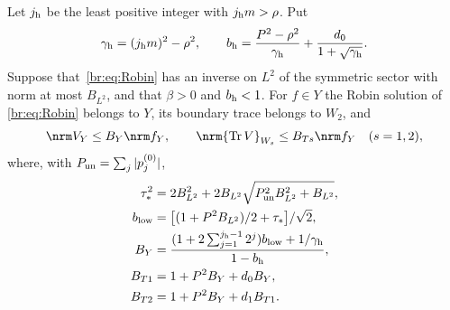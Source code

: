 \begin{proposition}\label{br:prop:transfer}
Let $j_{\rm h}$ be the least positive integer with $j_{\rm h}m>\rho$. Put
\begin{equation}\label{br:eq:high-data}
 \gamma_{\rm h}=(j_{\rm h}m)^2-\rho^2,\qquad
 b_{\rm h}=\frac{P^2-\rho^2}{\gamma_{\rm h}}+\frac{d_0}{1+\sqrt{\gamma_{\rm h}}}.
\end{equation}
Suppose that~\eqref{br:eq:Robin} has an inverse on $L^2$ of the
symmetric sector with norm at most $B_{L^2}$, and that $\beta>0$
and $b_{\rm h}<1$. For $f\in Y$ the Robin solution of
\eqref{br:eq:Robin} belongs to $Y$, its boundary trace belongs to $W_2$,
and
\begin{equation}\label{br:eq:transfer-bounds}
 \nrm V_Y\le B_Y\nrm f_Y,\qquad
 \nrm{\operatorname{Tr}V}_{W_s}\le B_{Ts}\nrm f_Y\quad(s=1,2),
\end{equation}
where, with $P_{\rm un}=\sum_j|p_j^{(0)}|$,
\begin{equation}\label{br:eq:transfer-constants}
 \begin{split}
 \tau_*^2&=2B_{L^2}^2+
 2B_{L^2}\sqrt{P_{\rm un}^2B_{L^2}^2+B_{L^2}},\\
 b_{\rm low}&=\bigl[(1+P^2B_{L^2})/2+\tau_*\bigr]/\sqrt2,\\
 B_Y&=\frac{(1+2\sum_{j=1}^{j_{\rm h}-1}2^j)b_{\rm low}+1/\gamma_{\rm h}}{1-b_{\rm h}},\\
 B_{T1}&=1+P^2B_Y+d_0B_Y,\\
 B_{T2}&=1+P^2B_Y+d_1B_{T1}.
 \end{split}
\end{equation}
\end{proposition}
